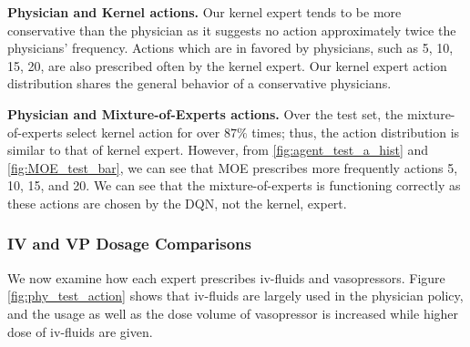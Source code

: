 \documentclass[letterpaper]{article}
\begin{document}
\textbf{Physician and Kernel actions. }
Our kernel expert tends to be more conservative than the physician as it suggests no action approximately twice the   physicians' frequency. Actions which are in favored by physicians, such as 5, 10, 15, 20, are also prescribed often by the kernel expert. Our kernel expert action distribution shares the general behavior of a conservative physicians.

\textbf{Physician and Mixture-of-Experts actions. }
Over the test set, the mixture-of-experts select kernel action for over $87\%$ times; thus, the action distribution is similar to that of kernel expert. However, from \ref{fig:agent_test_a_hist} and \ref{fig:MOE_test_bar}, we can see that MOE prescribes more frequently actions 5, 10, 15, and 20. We can see that the mixture-of-experts is functioning
correctly as these actions are chosen by the DQN, not the kernel, expert. 

\subsubsection{IV and VP Dosage Comparisons}

We now examine how each expert prescribes iv-fluids and vasopressors. Figure \ref{fig:phy_test_action} shows that iv-fluids are largely used in the physician policy, and the usage as well as the dose volume of vasopressor is increased while higher dose of iv-fluids are given.
\end{document}
